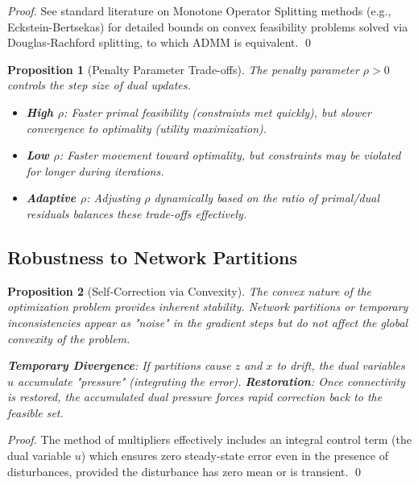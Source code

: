 \documentclass[11pt]{article}
\newtheorem{proposition}{Proposition}
\begin{document}
\begin{proof}
See standard literature on Monotone Operator Splitting methods (e.g., Eckstein-Bertsekas) for detailed bounds on convex feasibility problems solved via Douglas-Rachford splitting, to which ADMM is equivalent.
\qed
\end{proof}

\begin{proposition}[Penalty Parameter Trade-offs]
\label{prop:rho-tradeoffs}
The penalty parameter $\rho > 0$ controls the step size of dual updates.

\begin{itemize}
    \item \textbf{High $\rho$}: Faster primal feasibility (constraints met quickly), but slower convergence to optimality (utility maximization).
    \item \textbf{Low $\rho$}: Faster movement toward optimality, but constraints may be violated for longer during iterations.
    \item \textbf{Adaptive $\rho$}: Adjusting $\rho$ dynamically based on the ratio of primal/dual residuals balances these trade-offs effectively.
\end{itemize}

\end{proposition}

\subsection{Robustness to Network Partitions}

\begin{proposition}[Self-Correction via Convexity]
The convex nature of the optimization problem provides inherent stability. Network partitions or temporary inconsistencies appear as "noise" in the gradient steps but do not affect the global convexity of the problem.

\textbf{Temporary Divergence}: If partitions cause $z$ and $x$ to drift, the dual variables $u$ accumulate "pressure" (integrating the error).
\textbf{Restoration}: Once connectivity is restored, the accumulated dual pressure forces rapid correction back to the feasible set.
\end{proposition}

\begin{proof}
The method of multipliers effectively includes an integral control term (the dual variable $u$) which ensures zero steady-state error even in the presence of disturbances, provided the disturbance has zero mean or is transient. \qed
\end{proof}
\end{document}
